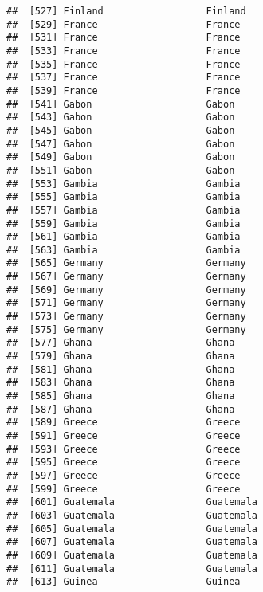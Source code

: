 \documentclass[]{article}
\begin{document}
\begin{verbatim}
##  [527] Finland                  Finland                 
##  [529] France                   France                  
##  [531] France                   France                  
##  [533] France                   France                  
##  [535] France                   France                  
##  [537] France                   France                  
##  [539] France                   France                  
##  [541] Gabon                    Gabon                   
##  [543] Gabon                    Gabon                   
##  [545] Gabon                    Gabon                   
##  [547] Gabon                    Gabon                   
##  [549] Gabon                    Gabon                   
##  [551] Gabon                    Gabon                   
##  [553] Gambia                   Gambia                  
##  [555] Gambia                   Gambia                  
##  [557] Gambia                   Gambia                  
##  [559] Gambia                   Gambia                  
##  [561] Gambia                   Gambia                  
##  [563] Gambia                   Gambia                  
##  [565] Germany                  Germany                 
##  [567] Germany                  Germany                 
##  [569] Germany                  Germany                 
##  [571] Germany                  Germany                 
##  [573] Germany                  Germany                 
##  [575] Germany                  Germany                 
##  [577] Ghana                    Ghana                   
##  [579] Ghana                    Ghana                   
##  [581] Ghana                    Ghana                   
##  [583] Ghana                    Ghana                   
##  [585] Ghana                    Ghana                   
##  [587] Ghana                    Ghana                   
##  [589] Greece                   Greece                  
##  [591] Greece                   Greece                  
##  [593] Greece                   Greece                  
##  [595] Greece                   Greece                  
##  [597] Greece                   Greece                  
##  [599] Greece                   Greece                  
##  [601] Guatemala                Guatemala               
##  [603] Guatemala                Guatemala               
##  [605] Guatemala                Guatemala               
##  [607] Guatemala                Guatemala               
##  [609] Guatemala                Guatemala               
##  [611] Guatemala                Guatemala               
##  [613] Guinea                   Guinea                  

\end{verbatim}
\end{document}
